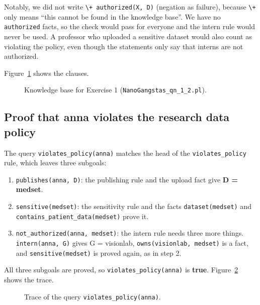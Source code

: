 \documentclass{article}
\newcommand{\team}{NanoGangstas}          %
\begin{document}
Notably, we did not write \texttt{\textbackslash+ authorized(X, D)} (negation as failure), because \texttt{\textbackslash+} only means ``this cannot be found in the knowledge base''.
We have no \texttt{authorized} facts, so the check would pass for everyone and the intern rule would never be used.
A professor who uploaded a sensitive dataset would also count as violating the policy, even though the statements only say that interns are not authorized.

Figure~\ref{fig:kb1} shows the clauses.

\begin{figure}[!htb]
  \VerbatimInput{../\team_qn_1_2.pl}
  \caption{Knowledge base for Exercise 1 (\texttt{\team\_qn\_1\_2.pl}).}
  \label{fig:kb1}
\end{figure}

\clearpage

\subsection{Proof that anna violates the research data policy}

The query \texttt{violates\_policy(anna)} matches the head of the \texttt{violates\_policy} rule, which leaves three subgoals:

\begin{enumerate}
  \item \texttt{publishes(anna, D)}: the publishing rule and the upload fact give \textbf{D = medset}.
  \item \texttt{sensitive(medset)}: the sensitivity rule and the facts \texttt{dataset(medset)} and \texttt{contains\_patient\_data(medset)} prove it.
  \item \texttt{not\_authorized(anna, medset)}: the intern rule needs three more things. \texttt{intern(anna,~G)} gives G = visionlab, \texttt{owns(visionlab, medset)} is a fact, and \texttt{sensitive(medset)} is proved again, as in step 2.
\end{enumerate}

All three subgoals are proved, so \texttt{violates\_policy(anna)} is \textbf{true}.
Figure~\ref{fig:trace1} shows the trace.

\begin{figure}[!htb]
  \caption{Trace of the query \texttt{violates\_policy(anna)}.}
  \label{fig:trace1}
\end{figure}

\clearpage
\end{document}
